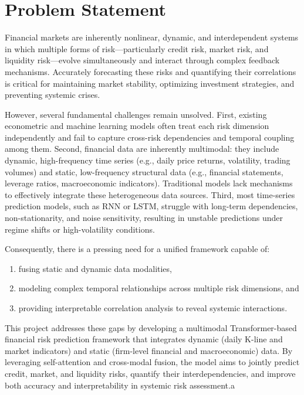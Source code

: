\section{Problem Statement}
\label{sec:Problem Statement}

Financial markets are inherently nonlinear, dynamic, and interdependent systems in which multiple forms of risk—particularly credit risk, market risk, and liquidity risk—evolve simultaneously and interact through complex feedback mechanisms. Accurately forecasting these risks and quantifying their correlations is critical for maintaining market stability, optimizing investment strategies, and preventing systemic crises.

However, several fundamental challenges remain unsolved.
First, existing econometric and machine learning models often treat each risk dimension independently and fail to capture cross-risk dependencies and temporal coupling among them.
Second, financial data are inherently multimodal: they include dynamic, high-frequency time series (e.g., daily price returns, volatility, trading volumes) and static, low-frequency structural data (e.g., financial statements, leverage ratios, macroeconomic indicators). Traditional models lack mechanisms to effectively integrate these heterogeneous data sources.
Third, most time-series prediction models, such as RNN or LSTM, struggle with long-term dependencies, non-stationarity, and noise sensitivity, resulting in unstable predictions under regime shifts or high-volatility conditions.

Consequently, there is a pressing need for a unified framework capable of:
\begin{enumerate}[label=(\arabic*)]
    \item fusing static and dynamic data modalities,
    \item modeling complex temporal relationships across multiple risk dimensions, and
    \item providing interpretable correlation analysis to reveal systemic interactions.
\end{enumerate}

This project addresses these gaps by developing a multimodal Transformer-based financial risk prediction framework that integrates dynamic (daily K-line and market indicators) and static (firm-level financial and macroeconomic) data. By leveraging self-attention and cross-modal fusion, the model aims to jointly predict credit, market, and liquidity risks, quantify their interdependencies, and improve both accuracy and interpretability in systemic risk assessment.a